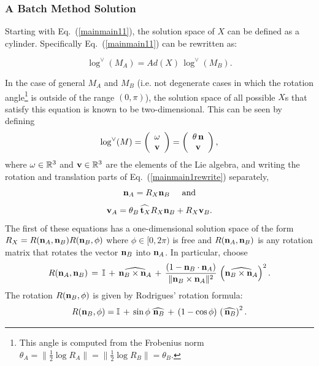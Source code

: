 \documentclass[twocolumn,10pt]{asme2ej}
\newcommand{\II}{\mathbb{I}}
\newcommand{\half}{\frac{1}{2}}
\begin{document}
\subsubsection{A Batch Method Solution}
\label{sec:batch_meth_sol}
Starting with Eq.~(\ref{mainmain11}), the solution space of $X$ can be defined as a cylinder. Specifically Eq.~(\ref{mainmain11}) can be rewritten as:

\begin{equation}
\log^{\vee}(M_A)  = Ad(X) \,\log^{\vee}(M_B).
\label{mainmain1rewrite} \end{equation}

In the case of general $M_A$ and $M_B$ (i.e. not degenerate cases in which the rotation angle\footnote{This angle is computed from the Frobenius norm $\theta_A =\|\half \log R_A\| = \|\half \log R_B\|= \theta_B$.} is outside of the range
$(0,\pi)$), the solution space of all possible $X$s that satisfy this equation is known to be two-dimensional.
This can be seen by defining
$$ \log^{\vee}(M) = \left(\begin{array}{c}
\omega \\
{\bf v} \end{array} \right)
=\left(\begin{array}{c}
\theta \, {\bf n} \\
{\bf v} \end{array} \right), $$
where ${\bf \omega} \in \mathbb{R}^3$ and ${\bf v} \in \mathbb{R}^3$ are the elements of the Lie algebra, and writing the rotation and translation parts of Eq.~(\ref{mainmain1rewrite}) separately,
\begin{equation}
{\bf n}_A = R_X {\bf n}_B \hspace{5mm}\mbox{and}
\label{nanb} \end{equation}
\begin{equation}
{\bf v}_A = \theta_B \widehat{\,{\bf t}_X} R_X {\bf n}_B + R_X {\bf v}_B.
\label{vavb} \end{equation}
The first of these equations has a one-dimensional solution space of the form
$R_X = R({\bf n}_A, {\bf n}_B) R({\bf n}_B, \phi)$ where $\phi \in [0,2\pi)$ is free and
$R({\bf n}_A, {\bf n}_B)$ is any rotation matrix that rotates the vector ${\bf n}_B$ into ${\bf n}_A$.
In particular, choose
\begin{equation}
R({\bf n}_A, {\bf n}_B)  \,=\,
\II \,+\, \widehat{{\bf n}_B \times {\bf n}_A}
\,+\, \frac{(1- {\bf n}_B \cdot {\bf n}_A)}{\|{\bf n}_B \times {\bf n}_A\|^2} \, \left(\widehat{{\bf n}_B \times {\bf n}_A}\right)^2.
\label{transab}
\end{equation}
The rotation $R({\bf n}_B, \phi)$ is given by Rodrigues' rotation formula:
$$ R({\bf n}_B, \phi) = \II \,+\, \sin \phi \, \widehat{\,{\bf n}_B} \,+\, (1-\cos \phi)\, \left(\widehat{\,{\bf n}_B}\right)^2. $$
\end{document}
